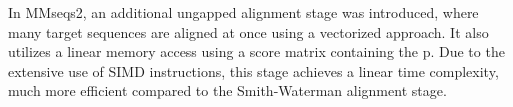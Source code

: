  In MMseqs2, an additional ungapped alignment stage was introduced, where many target sequences are aligned at once using a vectorized approach. It also utilizes a linear memory access using a score matrix containing the p. Due to the extensive use of SIMD instructions, this stage achieves a linear time complexity, much more efficient compared to the Smith-Waterman alignment stage.
